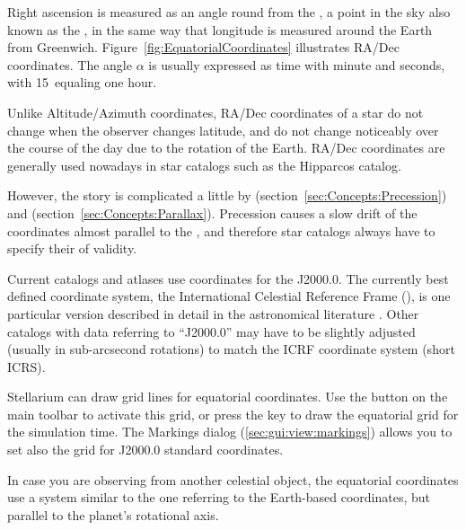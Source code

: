Right ascension is measured as an angle round from the , a point in the sky
also known as the  \Aries, in the same way that
longitude is measured around the Earth from
Greenwich. Figure~\ref{fig:EquatorialCoordinates} illustrates RA/Dec
coordinates. The angle $\alpha$ is usually expressed as time with
minute and seconds, with 15\degree\ equaling one hour.

Unlike Altitude/Azimuth coordinates, RA/Dec coordinates of a star do
not change when the observer changes latitude, and do not change
noticeably over the course of the day due to the rotation of the
Earth.  RA/Dec coordinates are generally used nowadays in star
catalogs such as the Hipparcos catalog.

However, the story is complicated a little by 
(section~\ref{sec:Concepts:Precession}) and 
(section~\ref{sec:Concepts:Parallax}). Precession causes a slow drift of the coordinates almost parallel to the , and therefore star catalogs always have to specify their  of
validity.

Current catalogs and atlases use coordinates for the
 J2000.0. The currently best defined
coordinate system, the International Celestial Reference Frame
(), is one particular version described in detail in
the astronomical literature \citep{ESAA:2013}. Other catalogs with data
referring to ``J2000.0'' may have to be slightly adjusted (usually in
sub-arcsecond rotations) to match the ICRF coordinate system (short ICRS).


Stellarium can draw grid lines for equatorial coordinates. Use the
button  on the main toolbar to activate
this grid, or press the  key to draw the equatorial grid for
the simulation time. The Markings dialog (\ref{sec:gui:view:markings})
allows you to set also the grid for J2000.0 standard coordinates.

In case you are observing from another celestial object, the
equatorial coordinates use a system similar to the one referring to
the Earth-based coordinates, but parallel to the planet's rotational
axis.

